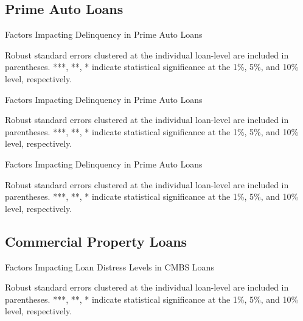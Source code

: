 \documentclass[10.5pt]{article}
\begin{document}
\subsection{Prime Auto Loans}
\begin{table}[H]
    \begin{center}
  \caption{Factors Impacting Delinquency in Prime Auto Loans}
    {\renewcommand\normalsize{\small}%
    \footnotesize
    }
    \end{center}
\end{table}
\noindent\footnotesize{Robust standard errors clustered at the individual loan-level are included in parentheses. ***, **, * indicate statistical significance at the 1\%, 5\%, and 10\% level, respectively.}
\newpage

\begin{table}[H]
    \begin{center}
  \caption{Factors Impacting Delinquency in Prime Auto Loans}
    {\renewcommand\normalsize{\small}%
    \footnotesize
    }
    \end{center}
\end{table}
\noindent\footnotesize{Robust standard errors clustered at the individual loan-level are included in parentheses. ***, **, * indicate statistical significance at the 1\%, 5\%, and 10\% level, respectively.}
\newpage

\begin{table}[H]
    \begin{center}
  \caption{Factors Impacting Delinquency in Prime Auto Loans}
    {\renewcommand\normalsize{\small}%
    \footnotesize
    }
    \end{center}
\end{table}
\noindent\footnotesize{Robust standard errors clustered at the individual loan-level are included in parentheses. ***, **, * indicate statistical significance at the 1\%, 5\%, and 10\% level, respectively.}
\newpage


\subsection{Commercial Property Loans}

\begin{table}[H]
    \begin{center}
  \caption{Factors Impacting Loan Distress Levels in CMBS Loans}
    {\renewcommand\normalsize{\small}%
    \footnotesize
    }
    \end{center}
\end{table}
\noindent\footnotesize{Robust standard errors clustered at the individual loan-level are included in parentheses. ***, **, * indicate statistical significance at the 1\%, 5\%, and 10\% level, respectively.}
\newpage
\end{document}

